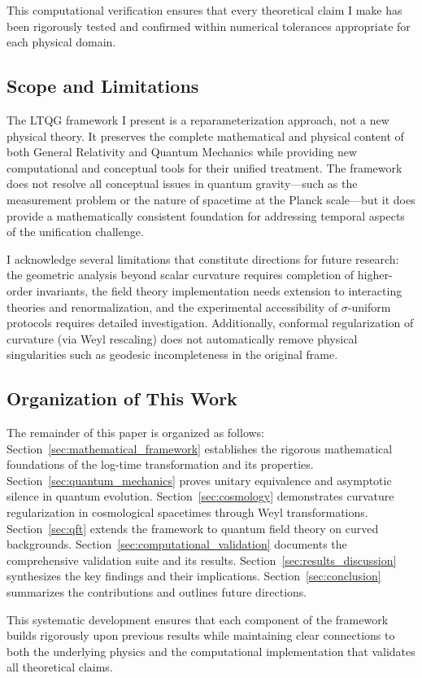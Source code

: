 This computational verification ensures that every theoretical claim I make has been rigorously tested and confirmed within numerical tolerances appropriate for each physical domain.

\subsection{Scope and Limitations}

The LTQG framework I present is a reparameterization approach, not a new physical theory. It preserves the complete mathematical and physical content of both General Relativity and Quantum Mechanics while providing new computational and conceptual tools for their unified treatment. The framework does not resolve all conceptual issues in quantum gravity—such as the measurement problem or the nature of spacetime at the Planck scale—but it does provide a mathematically consistent foundation for addressing temporal aspects of the unification challenge.

I acknowledge several limitations that constitute directions for future research: the geometric analysis beyond scalar curvature requires completion of higher-order invariants, the field theory implementation needs extension to interacting theories and renormalization, and the experimental accessibility of $\sigma$-uniform protocols requires detailed investigation. Additionally, conformal regularization of curvature (via Weyl rescaling) does not automatically remove physical singularities such as geodesic incompleteness in the original frame.

\subsection{Organization of This Work}

The remainder of this paper is organized as follows: Section~\ref{sec:mathematical_framework} establishes the rigorous mathematical foundations of the log-time transformation and its properties. Section~\ref{sec:quantum_mechanics} proves unitary equivalence and asymptotic silence in quantum evolution. Section~\ref{sec:cosmology} demonstrates curvature regularization in cosmological spacetimes through Weyl transformations. Section~\ref{sec:qft} extends the framework to quantum field theory on curved backgrounds. Section~\ref{sec:computational_validation} documents the comprehensive validation suite and its results. Section~\ref{sec:results_discussion} synthesizes the key findings and their implications. Section~\ref{sec:conclusion} summarizes the contributions and outlines future directions.

This systematic development ensures that each component of the framework builds rigorously upon previous results while maintaining clear connections to both the underlying physics and the computational implementation that validates all theoretical claims.